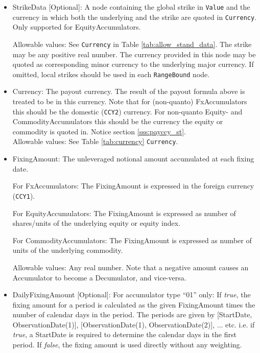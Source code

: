 \begin{itemize}

\item StrikeData [Optional]: A node containing the global strike in \lstinline!Value! and the currency in which both the underlying and the strike are quoted in \lstinline!Currency!. Only supported for EquityAccumulators. 

Allowable values: See \lstinline!Currency! in Table \ref{tab:allow_stand_data}. The strike may be any positive real number. The currency provided in this node may be quoted as corresponding minor currency to the underlying major currency. If omitted, local strikes should be used in each \lstinline!RangeBound! node.

\item Currency: The payout currency. The result of the payout formula above is treated to be in this currency. Note that for (non-quanto) FxAccumulators this should be the domestic (\lstinline!CCY2!) currency. For non-quanto Equity- and CommodityAccumulators this should be the currency the equity or commodity is quoted in. Notice section \ref{sss:payccy_st}. \\

Allowable values: See Table \ref{tab:currency} \lstinline!Currency!.

\item FixingAmount: The unleveraged notional amount accumulated at each fixing date.

For FxAccumulators: The FixingAmount is expressed in the foreign currency (\lstinline!CCY1!). 

For EquityAccumulators: The FixingAmount is expressed as number of shares/units of the underlying equity or equity index.

For CommodityAccumulators: The FixingAmount is expressed as number of units of the underlying commodity.

    Allowable values: Any real number. Note that a negative amount causes an Accumulator to become a Decumulator, and vice-versa. 

\item DailyFixingAmount [Optional]: For accumulator type ``01'' only: If \emph{true}, the fixing amount for a period is calculated as the given FixingAmount times the number of calendar days in the period. The periods are given by [StartDate, ObservationDate(1)], [ObservationDate(1), ObservationDate(2)], ... etc. i.e. if \emph{true}, a StartDate is required to determine the calendar days in the first period. If \emph{false}, the fixing amount is used directly without any weighting.


\end{itemize}
